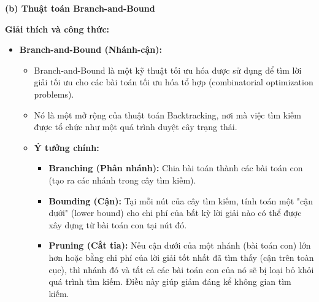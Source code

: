 \documentclass{article}
\begin{document}

\textbf{(b) Thuật toán Branch-and-Bound}

\textbf{Giải thích và công thức:}

\begin{itemize}
    \item \textbf{Branch-and-Bound (Nhánh-cận):}
    \begin{itemize}
        \item Branch-and-Bound là một kỹ thuật tối ưu hóa được sử dụng để tìm lời giải tối ưu cho các bài toán tối ưu hóa tổ hợp (combinatorial optimization problems).
        \item Nó là một mở rộng của thuật toán Backtracking, nơi mà việc tìm kiếm được tổ chức như một quá trình duyệt cây trạng thái.
        \item \textbf{Ý tưởng chính:}
            \begin{itemize}
                \item \textbf{Branching (Phân nhánh):} Chia bài toán thành các bài toán con (tạo ra các nhánh trong cây tìm kiếm).
                \item \textbf{Bounding (Cận):} Tại mỗi nút của cây tìm kiếm, tính toán một "cận dưới" (lower bound) cho chi phí của bất kỳ lời giải nào có thể được xây dựng từ bài toán con tại nút đó.
                \item \textbf{Pruning (Cắt tỉa):} Nếu cận dưới của một nhánh (bài toán con) lớn hơn hoặc bằng chi phí của lời giải tốt nhất đã tìm thấy (cận trên toàn cục), thì nhánh đó và tất cả các bài toán con của nó sẽ bị loại bỏ khỏi quá trình tìm kiếm. Điều này giúp giảm đáng kể không gian tìm kiếm.
            \end{itemize}
    \end{itemize}


\end{itemize}
\end{document}
